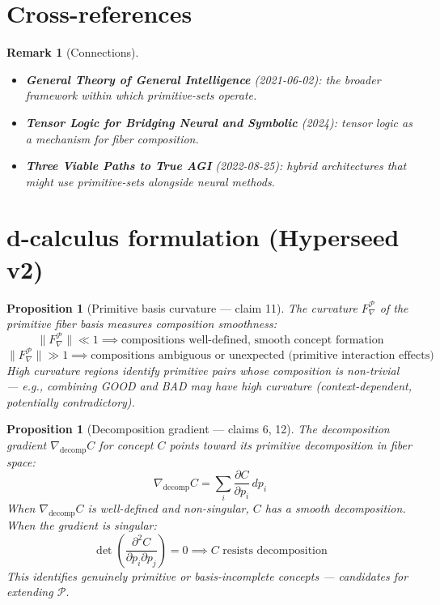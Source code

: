 \documentclass[11pt,a4paper]{article}
\newtheorem{proposition}[definition]{Proposition}
\newtheorem{remark}[definition]{Remark}
\begin{document}
\section{Cross-references}

\begin{remark}[Connections]
\begin{itemize}
\item \textbf{General Theory of General Intelligence} (2021-06-02):
  the broader framework within which primitive-sets operate.
\item \textbf{Tensor Logic for Bridging Neural and Symbolic} (2024):
  tensor logic as a mechanism for fiber composition.
\item \textbf{Three Viable Paths to True AGI} (2022-08-25): hybrid
  architectures that might use primitive-sets alongside neural methods.
\end{itemize}
\end{remark}

\section{d-calculus formulation (Hyperseed v2)}

\begin{proposition}[Primitive basis curvature --- claim 11]
\label{prop:curvature}
The curvature $F_\nabla^\mathcal{P}$ of the primitive fiber basis measures
composition smoothness:
\[
  \|F_\nabla^\mathcal{P}\| \ll 1 \implies \text{compositions well-defined,
    smooth concept formation}
\]
\[
  \|F_\nabla^\mathcal{P}\| \gg 1 \implies \text{compositions ambiguous or
    unexpected (primitive interaction effects)}
\]
High curvature regions identify primitive pairs whose composition is
non-trivial --- e.g., combining GOOD and BAD may have high curvature
(context-dependent, potentially contradictory).
\end{proposition}

\begin{proposition}[Decomposition gradient --- claims 6, 12]
\label{prop:gradient}
The decomposition gradient $\nabla_{\text{decomp}} C$ for concept $C$
points toward its primitive decomposition in fiber space:
\[
  \nabla_{\text{decomp}} C = \sum_i \frac{\partial C}{\partial p_i}\, dp_i
\]
When $\nabla_{\text{decomp}} C$ is well-defined and non-singular, $C$ has
a smooth decomposition. When the gradient is singular:
\[
  \det\left(\frac{\partial^2 C}{\partial p_i \partial p_j}\right) = 0
  \implies C \text{ resists decomposition}
\]
This identifies genuinely primitive or basis-incomplete concepts ---
candidates for extending $\mathcal{P}$.
\end{proposition}
\end{document}
